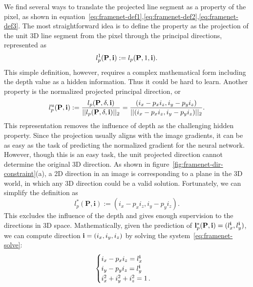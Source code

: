 We find several ways to translate the projected line segment as a property of the pixel, as shown in equation~\ref{eq:framenet-def1},\ref{eq:framenet-def2},\ref{eq:framenet-def3}. The most straightforward idea is to define the property as the projection of the unit 3D line segment from the pixel through the principal directions, represented as 
\begin{equation}
    l^1_p(\textbf{P},\textbf{i}) := l_p(\textbf{P},1,\mathbf{i}).
    \label{eq:framenet-def1}
\end{equation}
This simple definition, however, requires a complex mathematical form including the depth value as a hidden information. Thus it could be hard to learn. Another property is the normalized projected principal direction, or
\begin{equation}
    l^u_p(\textbf{P},\textbf{i}) := \frac{l_p(\textbf{P},\delta,\mathbf{i})}{||l_p(\textbf{P},\delta,\mathbf{i})||_2} = \frac{(i_x - p_x i_z, i_y - p_y i_z)}{||(i_x - p_x i_z, i_y - p_y i_z)||_2}.
    \label{eq:framenet-def2}
\end{equation}
This representation removes the influence of depth as the challenging hidden property. Since the projection usually aligns with the image gradients, it can be as easy as the task of predicting the normalized gradient for the neural network. However, though this is an easy task, the unit projected direction cannot determine the original 3D direction. As shown in figure~\ref{fig:framenet-dir-constraint}(a), a 2D direction in an image is corresponding to a plane in the 3D world, in which any 3D direction could be a valid solution. Fortunately, we can simplify the definition as
\begin{equation}
    l_p^*(\textbf{P},\textbf{i}) := (i_x - p_xi_z, i_y-p_yi_z).
    \label{eq:framenet-def3}
\end{equation}
This excludes the influence of the depth and gives enough supervision to the directions in 3D space. Mathematically, given the prediction of $\mathbf{l}_p^*(\mathbf{P},\mathbf{i})=(l^{\mathbf{i}}_x,l^{\mathbf{i}}_y)$, we can compute direction $\mathbf{i}=(i_x,i_y,i_z)$ by solving the system~\ref{eq:framenet-solve}:
\begin{equation}
\begin{cases}
  i_x - p_x i_z = l^{\mathbf{i}}_x\\
  i_y - p_y i_z = l^{\mathbf{i}}_y\\
  i_x^2 +i_y^2 + i_z^2 = 1\,.
\end{cases}
\label{eq:framenet-solve}
\end{equation}
